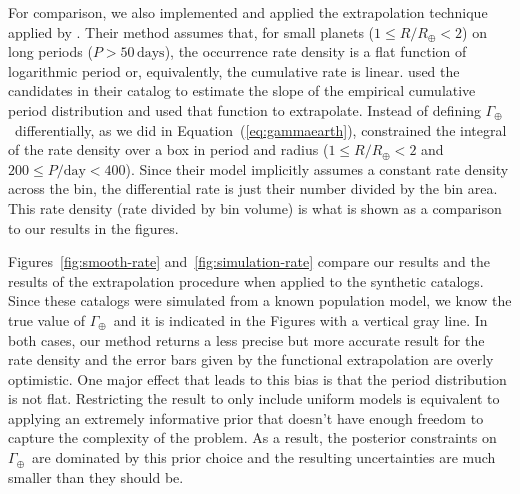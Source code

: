 \documentclass[12pt,preprint]{aastex}
\newcommand{\figref}[1]{\ref{fig:#1}}
\newcommand{\Eq}[1]{Equation~(\ref{eq:#1})}
\newcommand{\eq}[1]{\Eq{#1}}
\newcommand{\rate}{\ensuremath{\Gamma}}
\newcommand{\radius}{\ensuremath{R}}
\newcommand{\period}{\ensuremath{P}}
\newcommand{\gammaearth}{{\ensuremath{\rate_\oplus}}}
\begin{document}
For comparison, we also implemented and applied the extrapolation technique
applied by \citet{petigura}.
Their method assumes that, for small planets ($1 \le \radius/\radius_\oplus <
2$) on long periods ($\period > 50\,\mathrm{days}$), the occurrence rate
density is a flat function of logarithmic period or, equivalently, the
cumulative rate is linear.
\citet{petigura} used the candidates in their catalog to estimate the slope of
the empirical cumulative period distribution and used that function to
extrapolate.
Instead of defining \gammaearth\ differentially, as we did in \eq{gammaearth},
\citet{petigura} constrained the integral of the rate density over a box in
period and radius ($1 \le \radius/\radius_\oplus < 2$ and $200 \le
\period/\mathrm{day} < 400$).
Since their model implicitly assumes a constant rate density across the bin,
the differential rate is just their number divided by the bin area.
This rate density (rate divided by bin volume) is what is shown as a
comparison to our results in the figures.

Figures~\figref{smooth-rate} and~\figref{simulation-rate} compare our results
and the results of the \citet{petigura} extrapolation procedure when applied
to the synthetic catalogs.
Since these catalogs were simulated from a known population model, we know the
true value of \gammaearth\ and it is indicated in the Figures with a vertical
gray line.
In both cases, our method returns a less precise but more accurate result for
the rate density and the error bars given by the functional extrapolation
are overly optimistic.
One major effect that leads to this bias is that the period distribution is
not flat.
Restricting the result to only include uniform models is equivalent to
applying an extremely informative prior that doesn't have enough freedom to
capture the complexity of the problem.
As a result, the posterior constraints on \gammaearth\ are dominated by this
prior choice and the resulting uncertainties are much smaller than they should
be.
\end{document}
